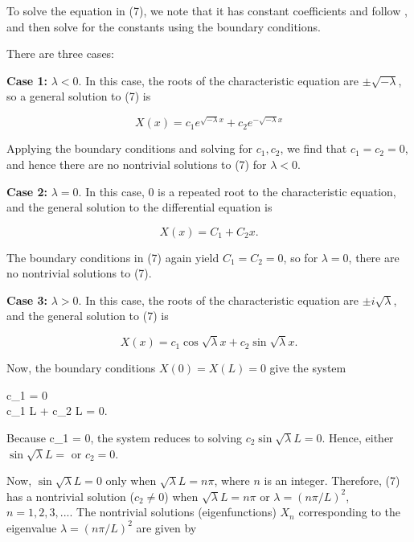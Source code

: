 \documentclass{article}
\begin{document}
To solve the equation in (7), we note that it has constant coefficients and follow , and then solve for the constants using the boundary conditions.

There are three cases:

\textbf{Case 1:} $\lambda < 0$. In this case, the roots of the characteristic equation are $\pm \sqrt{- \lambda}$, so a general solution to (7) is

\[ X(x) = c_1 e^{\sqrt{-\lambda}x} + c_2 e^{-\sqrt{-\lambda}x} \]

Applying the boundary conditions and solving for $c_1, c_2$, we find that $c_1 = c_2 = 0$, and hence there are no nontrivial solutions to (7) for $\lambda < 0$.

\textbf{Case 2:} $\lambda = 0$. In this case, $0$ is a repeated root to the characteristic equation, and the general solution to the differential equation is

\[ X(x) = C_1 + C_2x. \]

The boundary conditions in (7) again yield $C_1 = C_2 = 0$, so for $\lambda = 0$, there are no nontrivial solutions to (7).

\textbf{Case 3:} $\lambda > 0$. In this case, the roots of the characteristic equation are $\pm i\sqrt{\lambda}$, and the general solution to (7) is

\[ X(x) = c_1 \cos{\sqrt{\lambda}x} + c_2 \sin{\sqrt{\lambda}x}. \tag{8} \]

Now, the boundary conditions $X(0) = X(L) = 0$ give the system

\bal c_1 = 0 \\ c_1 \cos{\sqrt{\lambda}}L + c_2 \sin{\sqrt{\lambda}}L = 0. \eal

Because c\_1 = 0, the system reduces to solving $c_2 \sin{\sqrt{\lambda}}L = 0.$ Hence, either $\sin{\sqrt{\lambda}L} = $ or $c_2 = 0$.

Now,  $\sin{\sqrt{\lambda}L} = 0$ only when $\sqrt{\lambda}L = n \pi$, where $n$ is an \@{integer}. Therefore, (7) has a nontrivial solution ($c_2 \neq 0$) when $\sqrt{\lambda}L = n \pi$ or $\lambda = (n \pi / L)^2$, $n = 1,2,3,...$. The nontrivial solutions (eigenfunctions) $X_n$ corresponding to the eigenvalue $\lambda = (n \pi/L)^2$ are given by
\end{document}
